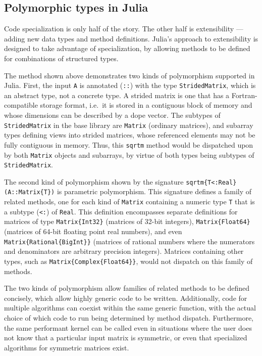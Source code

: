 
\subsection{Polymorphic types in Julia}

Code specialization is only half of the story.
The other half is extensibility --- adding new data types and
method definitions.
Julia's approach to extensibility is designed to take advantage of
specialization, by allowing methods to be defined for combinations
of structured types.

The method shown above demonstrates two kinds of polymorphism supported in
Julia. First, the input \lstinline|A| is annotated (\lstinline|::|) with the
type \lstinline|StridedMatrix|, which is an abstract type, not a concrete type.
A strided matrix is one that has a Fortran-compatible storage format, i.e.\ it
is stored in a contiguous block of memory and whose dimensions can be described
by a dope vector. The subtypes of \lstinline|StridedMatrix| in the base
library are \lstinline|Matrix| (ordinary matrices), and subarray types defining
views into strided matrices, whose referenced elements may not be fully
contiguous in memory. Thus, this \lstinline|sqrtm| method would be
dispatched upon by both \lstinline|Matrix| objects and subarrays, by virtue of
both types being subtypes of \lstinline|StridedMatrix|.

The second kind of polymorphism shown by the signature
\lstinline|sqrtm{T<:Real}(A::Matrix{T})| is parametric polymorphism. This
signature defines a family of related methods, one for each kind of
\lstinline|Matrix| containing a numeric type \lstinline|T| that is a subtype
(\lstinline|<:|) of \lstinline|Real|. This definition encompasses separate
definitions for matrices of type \lstinline|Matrix{Int32}| (matrices of 32-bit
integers), \lstinline|Matrix{Float64}| (matrices of 64-bit floating point real
numbers), and even \lstinline|Matrix{Rational{BigInt}}| (matrices of rational
numbers where the numerators and denominators are arbitrary precision
integers). Matrices containing other types, such as
\lstinline|Matrix{Complex{Float64}}|, would not dispatch on this family of methods.

The two kinds of polymorphism allow families of related methods to be defined
concisely, which allow highly generic code to be written. Additionally, code for
multiple algorithms can coexist within the same generic function, with the actual
choice of which code to run being determined by method dispatch. Furthermore,
the same performant kernel can be called even in situations where the user does
not know that a particular input matrix is symmetric, or even that specialized
algorithms for symmetric matrices exist.


